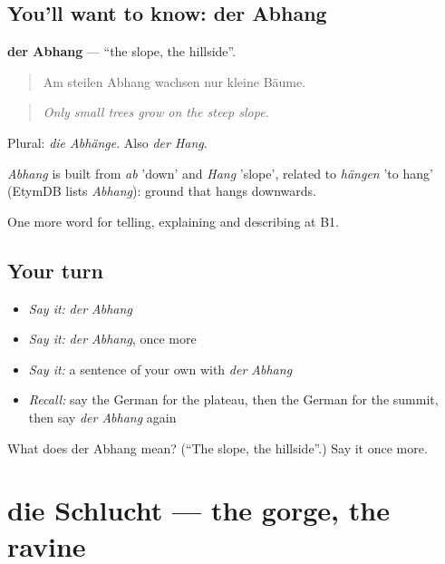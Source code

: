 \subsection*{You'll want to know: der Abhang}
\textbf{der Abhang} — \textquotedblleft{}the slope, the hillside\textquotedblright{}.

\begin{quote}
Am steilen Abhang wachsen nur kleine Bäume.
\end{quote}

\begin{quote}
\emph{Only small trees grow on the steep slope.}
\end{quote}

Plural: \emph{die Abhänge}. Also \emph{der Hang}.

\begin{cousinweb}
\emph{Abhang} is built from \emph{ab} 'down' and \emph{Hang} 'slope', related to \emph{hängen} 'to hang' (EtymDB lists \emph{Abhang}): ground that hangs downwards.
\end{cousinweb}

\begin{grammarlens}[title={What you've built}]
One more word for telling, explaining and describing at B1.
\end{grammarlens}

\subsection*{Your turn}
\begin{itemize}
\raggedright
  \item \emph{Say it:} \emph{der Abhang}
  \item \emph{Say it:} \emph{der Abhang}, once more
  \item \emph{Say it:} a sentence of your own with \emph{der Abhang}
  \item \emph{Recall:} say the German for the plateau, then the German for the summit, then say \emph{der Abhang} again
\end{itemize}

\begin{tcolorbox}[breakable,colback=teal!4,colframe=teal!35!black,title={Before you move on}]
What does der Abhang mean? (\textquotedblleft{}The slope, the hillside\textquotedblright{}.) Say it once more.
\end{tcolorbox}
\section[die Schlucht]{die Schlucht — the gorge, the ravine}

